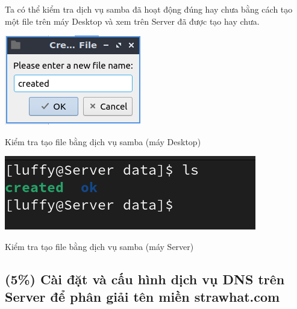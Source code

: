 \documentclass[a4paper, 11pt]{article}
\begin{document}
Ta có thể kiểm tra dịch vụ samba đã hoạt động đúng hay chưa bằng cách tạo một file trên máy Desktop và xem trên Server đã được tạo hay chưa.

\begin{multicols}{2}
    \begin{minipage}
        {\linewidth}
        \captionsetup{type=figure}
        \centering
        \includegraphics[width=\linewidth]{images/samba-created.png}
        \caption{Kiểm tra tạo file bằng dịch vụ samba (máy Desktop)}
        \label{figure:samba-created}
    \end{minipage}

    \begin{minipage}
        {\linewidth}
        \captionsetup{type=figure}
        \centering
        \includegraphics[width=\linewidth]{images/samba-created-server.png}
        \caption{Kiểm tra tạo file bằng dịch vụ samba (máy Server)}
        \label{figure:samba-created-server}
    \end{minipage}
\end{multicols}

\subsection{(5\%) Cài đặt và cấu hình dịch vụ DNS trên Server để phân giải tên miền strawhat.com}
\end{document}
